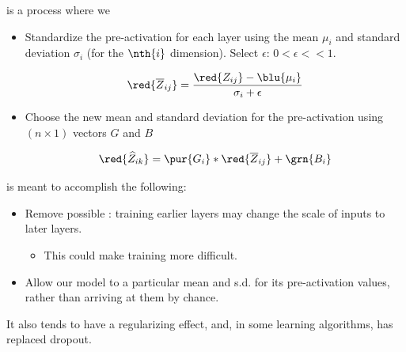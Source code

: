             \begin{definition}
                 is a process where we

                \begin{itemize}
                    \item Standardize the pre-activation for each layer using the mean $\mu_i$ and standard deviation $\sigma_i$ (for the $\nth{i}$ dimension). Select $\epsilon$: $0 < \epsilon<<1$.

                    \begin{equation*}
                        \red{ \overline{Z}_{ij} } =  \frac{ \red{Z_{ij}}  -\blu{\mu_i}}{\sigma_i+\epsilon}
                    \end{equation*}
                    
                    \item Choose the new mean and standard deviation for the pre-activation using $(n \times 1)$ vectors $G$ and $B$

                    \begin{equation*}
                        \red{\widehat{Z}_{ik}} = \pur{G_i} * \red{\overline{Z}_{ij}} + \grn{B_i}
                    \end{equation*}
                \end{itemize}
                
            \end{definition}

            \phantom{}

            \begin{concept}
                 is meant to accomplish the following:

                \begin{itemize}
                    \item Remove possible : training earlier layers may change the scale of inputs to later layers.
                        \begin{itemize}
                            \item This could make training more difficult.
                        \end{itemize}
                    \item Allow our model to  a particular mean and s.d. for its pre-activation values, rather than arriving at them by chance.
                \end{itemize}

                It also tends to have a regularizing effect, and, in some learning algorithms, has replaced dropout.
            \end{concept}

